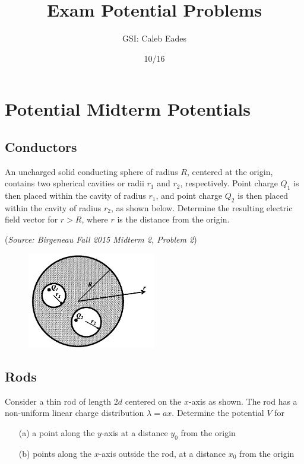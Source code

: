 \documentclass{article}
\begin{document}
\title{Exam Potential Problems}
\author{GSI: Caleb Eades}
\date{10/16}
\maketitle

\section{Potential Midterm Potentials}

\subsection{Conductors}

An uncharged solid conducting sphere of radius $R$, centered at the origin, contains two spherical cavities or radii $r_1$ and $r_2$, respectively. Point charge $Q_1$ is then placed within the cavity of radius $r_1$, and point charge $Q_2$ is then placed within the cavity of radius $r_2$, as shown below. Determine the resulting electric field vector for $r>R$, where $r$ is the distance from the origin.

(\textit{Source: Birgeneau Fall 2015 Midterm 2, Problem 2})

\begin{figure}[h]
	\begin{center}
	\includegraphics[width=0.5\textwidth]{ConductorMid.png}
	\end{center}
\end{figure}

\subsection{Rods}

Consider a thin rod of length $2d$ centered on the $x$-axis as shown. The rod has a non-uniform linear charge distribution $\lambda=ax$. Determine the potential $V$ for
\begin{itemize}
	\item[(a)] a point along the $y$-axis at a distance $y_0$ from the origin
	\item[(b)] points along the $x$-axis outside the rod, at a distance $x_0$ from the origin
\end{itemize}
\end{document}
